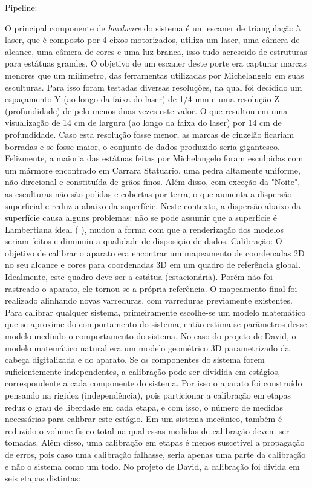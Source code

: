 Pipeline:

O principal componente de {\it hardware} do sistema é um escaner de triangulação à laser, que é composto por 4 eixos motorizados, utiliza um laser, uma câmera de alcance, uma câmera de cores e uma luz branca, isso tudo acrescido de estruturas para estátuas grandes. O objetivo de um escaner deste porte era capturar marcas menores que um milímetro, das ferramentas utilizadas por Michelangelo em suas esculturas. 
Para isso foram testadas diversas resoluções, na qual foi decidido um espaçamento Y (ao longo da faixa do laser) de 1/4 mm e uma resolução Z (profundidade) de pelo menos duas vezes este valor. O que resultou em uma visualização de 14 cm de largura (ao longo da faixa do laser) por 14 cm de profundidade. Caso esta resolução fosse menor, as marcas de cinzelão ficariam borradas e se fosse maior, o conjunto de dados produzido seria gigantesco.
Felizmente, a maioria das estátuas feitas por Michelangelo foram esculpidas com um mármore encontrado em Carrara Statuario, uma pedra altamente uniforme, não direcional e constituída de grãos finos. Além disso, com exceção da "Noite", as esculturas não são polidas e cobertas por terra, o que aumenta a dispersão superficial e reduz a abaixo da superfície.
Neste contexto, a dispersão abaixo da superfície causa alguns problemas: não se pode assumir que a superfície é Lambertiana ideal (%
), mudou a forma com que a renderização dos modelos seriam feitos e diminuiu a qualidade de disposição de dados.
Calibração:
O objetivo de calibrar o aparato era encontrar um mapeamento de coordenadas 2D no seu alcance e cores para coordenadas 3D em um quadro de referência global. Idealmente, este quadro deve ser a estátua (estacionária). Porém não foi rastreado o aparato, ele tornou-se a própria referência. O mapeamento final foi realizado alinhando novas varreduras, com varreduras previamente existentes.
Para calibrar qualquer sistema, primeiramente escolhe-se um modelo matemático que se aproxime do comportamento do sistema, então estima-se parâmetros desse modelo medindo o comportamento do sistema. No caso do projeto de David, o modelo matemático natural era um modelo geométrico 3D parametrizado da cabeça digitalizada e do aparato. Se os componentes do sistema forem suficientemente independentes, a calibração pode ser dividida em estágios, correspondente a cada componente do sistema. Por isso o aparato foi construído pensando na rigidez (independência), pois particionar a calibração em etapas reduz o grau de liberdade em cada etapa, e com isso, o número de medidas necessárias para calibrar este estágio.
Em um sistema mecânico, também é reduzido o volume físico total na qual essas medidas de calibração devem ser tomadas. Além disso, uma calibração em etapas é menos suscetível a propagação de erros, pois caso uma calibração falhasse, seria apenas uma parte da calibração e não o sistema como um todo. No projeto de David, a calibração foi divida em seis etapas distintas:

